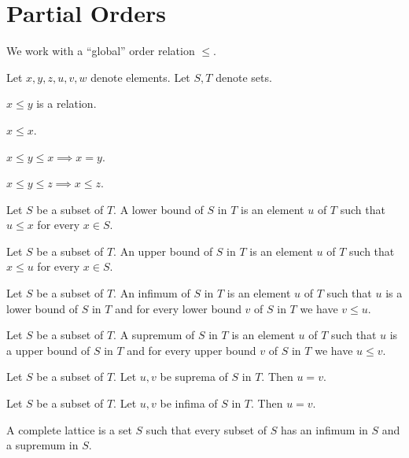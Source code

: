 \documentclass{article}
\begin{document}
  \section{Partial Orders}
  We work with a ``global'' order relation $\leq$.
  \begin{forthel}
    Let $x,y,z,u,v,w$ denote elements. Let $S,T$ denote sets.

    \begin{signature}
      $x \leq y$ is a relation.
    \end{signature}

    \begin{axiom}
      $x \leq x$.
    \end{axiom}

    \begin{axiom}
      $x \leq y \leq x \implies x = y$.
    \end{axiom}

    \begin{axiom}
      $x \leq y \leq z \implies x \leq z$.
    \end{axiom}

    \begin{definition}
      Let $S$ be a subset of $T$. A lower bound of $S$ in $T$ is an element $u$ of $T$ such that
      $u \leq x$ for every $x \in S$.
    \end{definition}

    \begin{definition}
      Let $S$ be a subset of $T$. An upper bound of $S$ in $T$ is an element $u$ of $T$ such that
      $x \leq u$ for every $x \in S$.
    \end{definition}

    \begin{definition}
      Let $S$ be a subset of $T$. An infimum of $S$ in $T$ is an element $u$ of $T$ such that
      $u$ is a lower bound of $S$ in $T$ and for every lower bound $v$ of $S$ in $T$ we have $v \leq u$.
    \end{definition}

    \begin{definition}
      Let $S$ be a subset of $T$. A supremum of $S$ in $T$ is an element $u$ of $T$ such that
      $u$ is a upper bound of $S$ in $T$ and for every upper bound $v$ of $S$ in $T$ we have $u \leq v$.
    \end{definition}

    \begin{lemma}
      Let $S$ be a subset of $T$. Let $u,v$ be suprema of $S$ in $T$. Then $u = v$.
    \end{lemma}

    \begin{lemma}
      Let $S$ be a subset of $T$. Let $u,v$ be infima of $S$ in $T$. Then $u = v$.
    \end{lemma}

    \begin{definition}
      A complete lattice is a set $S$ such that every subset of $S$ has an infimum in $S$ and a supremum in $S$.
    \end{definition}
  \end{forthel}
\end{document}
